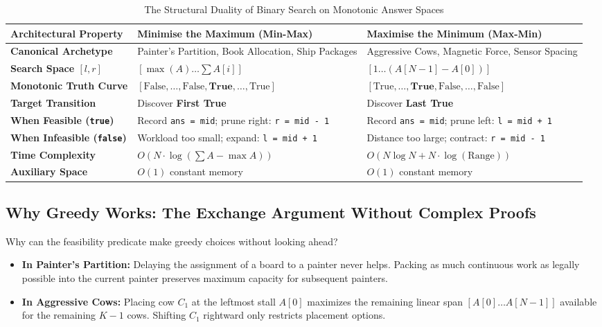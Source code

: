 \documentclass[10pt,journal,compsoc,onecolumn]{IEEEtran}
\begin{document}
\begin{table}[t]
\centering
\caption{The Structural Duality of Binary Search on Monotonic Answer Spaces}
\label{tab:duality}
\begin{tabular}{@{}p{3.2cm}p{6.5cm}p{6.5cm}@{}}
\toprule
\textbf{Architectural Property} & \textbf{Minimise the Maximum (Min-Max)} & \textbf{Maximise the Minimum (Max-Min)} \\ \midrule
\textbf{Canonical Archetype} & Painter's Partition, Book Allocation, Ship Packages & Aggressive Cows, Magnetic Force, Sensor Spacing \\
\textbf{Search Space $[l, r]$} & $[\max(A) \dots \sum A[i]]$ & $[1 \dots (A[N-1] - A[0])]$ \\
\textbf{Monotonic Truth Curve} & $[\text{False}, \dots, \text{False}, \mathbf{True}, \dots, \text{True}]$ & $[\text{True}, \dots, \mathbf{True}, \text{False}, \dots, \text{False}]$ \\
\textbf{Target Transition} & Discover \textbf{First True} & Discover \textbf{Last True} \\
\textbf{When Feasible (\texttt{true})} & Record \texttt{ans = mid}; prune right: \texttt{r = mid - 1} & Record \texttt{ans = mid}; prune left: \texttt{l = mid + 1} \\
\textbf{When Infeasible (\texttt{false})} & Workload too small; expand: \texttt{l = mid + 1} & Distance too large; contract: \texttt{r = mid - 1} \\
\textbf{Time Complexity} & $O(N \cdot \log(\sum A - \max A))$ & $O(N \log N + N \cdot \log(\text{Range}))$ \\
\textbf{Auxiliary Space} & $O(1)$ constant memory & $O(1)$ constant memory \\ \bottomrule
\end{tabular}
\end{table}

\subsection{Why Greedy Works: The Exchange Argument Without Complex Proofs}

Why can the feasibility predicate make greedy choices without looking ahead?
\begin{itemize}
    \item \textbf{In Painter's Partition:} Delaying the assignment of a board to a painter never helps. Packing as much continuous work as legally possible into the current painter preserves maximum capacity for subsequent painters.
    \item \textbf{In Aggressive Cows:} Placing cow $C_1$ at the leftmost stall $A[0]$ maximizes the remaining linear span $[A[0] \dots A[N-1]]$ available for the remaining $K - 1$ cows. Shifting $C_1$ rightward only restricts placement options.
\end{itemize}
\end{document}
